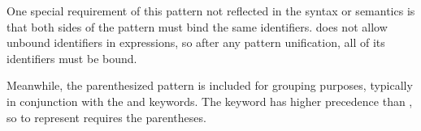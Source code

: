 One special requirement of this pattern not reflected in the syntax or
semantics is that both sides of the  pattern must bind the same
identifiers. \Trilogy{} does not allow unbound identifiers in expressions,
so after any pattern unification, all of its identifiers must be bound.

\begin{figure}[H]
    \centering
    \parbox[t]{0.4\linewidth}{
        \begin{prooftree}
        \end{prooftree}
    }
    \parbox[t]{0.4\linewidth}{
        \begin{prooftree}
        \end{prooftree}
    }
\end{figure}

Meanwhile, the parenthesized pattern is included for grouping purposes,
typically in conjunction with the  and  keywords. The
 keyword has higher precedence than , so to represent
 requires the parentheses.

\begin{prooftree}
\end{prooftree}
